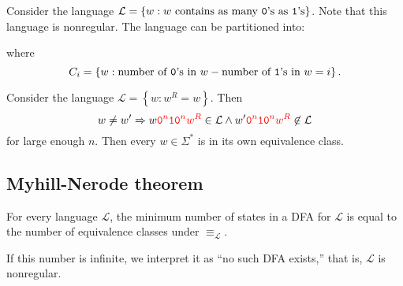 \documentclass{notes}
\begin{document}
\begin{eg}
  Consider the language $\mathcal L = \left \{ w : \text{$w$ contains as many \verb~0~'s as \verb~1~'s} \right \}$.
  Note that this language is nonregular.
  The language can be partitioned into: 
  
  \begin{center}
  \end{center}
  
  where 
  \[
    C_i = \left \{ w : \text{number of \verb~0~'s in $w$} - \text{number of \verb~1~'s in $w$} = i \right \}.
  \]
\end{eg}

\begin{eg}
  Consider the language $\mathcal L = \left \{ w : w^R = w \right \}$.
  Then 
  \[
    w \neq w' \Rightarrow w {\color{red} \verb~0~^n \verb~1~ \verb~0~^n w^R} \in \mathcal L \land w' {\color{red} \verb~0~^n \verb~1~ \verb~0~^n w^R} \not \in \mathcal L
  \]
  for large enough $n$.
  Then every $w \in \Sigma^*$ is in its own equivalence class.
\end{eg}

\newpage

\subsection{Myhill-Nerode theorem}

\begin{thm}
  For every language $\mathcal L$, the minimum number of states in a DFA for $\mathcal L$ is equal to the number of equivalence classes under $\equiv_\mathcal L$.
  
  If this number is infinite, we interpret it as ``no such DFA exists,'' that is, $\mathcal L$ is nonregular.
\end{thm}
\end{document}
